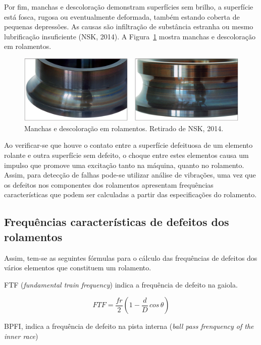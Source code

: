 \documentclass[
	12pt,				
	oneside,			
	a4paper,			
	english,			
	brazil,			
	]{abntex2ppgsi}
\begin{document}
Por fim, manchas e descoloração demonstram superfícies sem brilho, a superfície está fosca, rugosa ou eventualmente deformada, também estando coberta de pequenas depressões. As causas são infiltração de substância estranha ou mesmo lubrificação insuficiente (NSK, 2014). A Figura~\ref{manchas_nsk} mostra manchas e descoloração em rolamentos.

\begin{figure}[H]
\centering
\includegraphics[width=\textwidth,height=\textheight,keepaspectratio]{manchas_nsk}
\caption {Manchas e descoloração em rolamentos. Retirado de NSK, 2014.}
\label{manchas_nsk}
\end{figure}

Ao verificar-se que houve o contato entre a superfície defeituosa de um elemento rolante e outra superfície sem defeito, o choque entre estes elementos causa um impulso que promove uma excitação tanto na máquina, quanto no rolamento. Assim, para detecção de falhas pode-se utilizar análise de vibrações, uma vez que os defeitos nos componentes dos rolamentos apresentam frequências características que podem ser calculadas a partir das especificações do rolamento. 


\subsection{\textbf{Frequências características de defeitos dos rolamentos}}
Assim, tem-se as seguintes fórmulas para o cálculo das frequências de defeitos dos vários  elementos que constituem um rolamento. 

FTF (\textit{fundamental train frequency}) indica a frequência de defeito na gaiola. 

\begin{equation}
	FTF = \frac{fr}{2} \left ( 1 - \frac{d}{D} \,cos \, \theta \right ) 
	\label{eq: FTF}
\end{equation}


BPFI, indica a frequência de defeito na pista interna (\textit{ball pass frenquency of the inner race})
\end{document}
